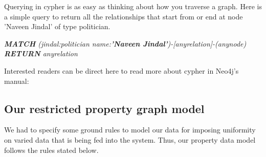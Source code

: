 Querying in cypher is as easy as thinking about how you traverse a graph. Here is a simple query to return all the relationships that start from or end at node 'Naveen Jindal' of type politician.

\emph{ \textbf{MATCH} (jindal:politician {name:\textbf{'Naveen Jindal'}})-[anyrelation]-(anynode)
 \textbf{RETURN} anyrelation }

Interested readers can be direct here to read more about cypher in Neo4j's manual\cite{neomanual}: 
\subsection{Our restricted property graph model}

We had to specify some ground rules to model our data for imposing uniformity on varied data that is being fed into the system. Thus, our property data model follows the rules stated below.

